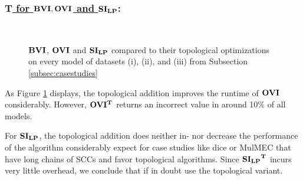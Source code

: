 \subsubsection*{\underline{$\mathbf{T}$ for $\mathbf{BVI}, \mathbf{OVI}$ and $\mathbf{SI_{LP}}$}:} \label{subsubsec:topologicalOptim}
\begin{figure}[h!]
    \centering
    \
    \caption{$\mathbf{BVI}$, $\mathbf{OVI}$ and $\mathbf{SI_{LP}}$ compared to their topological optimizations on every model of datasets (i), (ii), and (iii) from Subsection \ref{subsec:casestudies}}%
    \label{fig:Scatter_T}%
    \end{figure}
\FloatBarrier
As Figure \ref{fig:Scatter_T} displays, the topological addition improves the runtime of $\mathbf{OVI}$ considerably. 
However, $\mathbf{OVI^T}$ returns an incorrect value in around 10\% of all models.

For $\mathbf{SI_{LP}}$, the topological addition does neither in- nor decrease the performance of the algorithm considerably expect for case studies
like dice or MulMEC that have long chains of SCCs and favor topological algorithms.
Since $\mathbf{\mathbf{SI_{LP}}^T}$ incurs very little overhead, we conclude that if in doubt use the topological variant.

